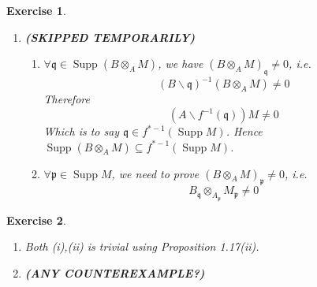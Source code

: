 \documentclass{article}
\theoremstyle{breakstyle}
\newtheorem{exercise}{Exercise}
\DeclareMathOperator{\ann}{Ann}
\DeclareMathOperator{\supp}{Supp}
\begin{document}
\begin{exercise}
\begin{enumerate}[label=({\roman*})]
\begin{align*}
                \supp{M / \mathfrak{a}M}
                &= \supp\left( (A / \mathfrak{a})\otimes _{A}M \right)  \\
                &= \supp(M)\cap \supp(A / \mathfrak{a}) \\
                &= V(\ann{M})\cap V(\ann{A / \mathfrak{a}}) \\
                &= V(\mathfrak{a}+\ann{M})
            \end{align*}
        \item 
            \textbf{(SKIPPED TEMPORARILY)}
            \begin{enumerate}[label=({\alph*})]
                \item 
                    $\forall \mathfrak{q}\in \supp{\left( B\otimes _{A}M \right) }$, we have $\left( B\otimes _{A}M \right) _{\mathfrak{q}}\neq 0$, i.e.
                    $$
                    \left( B\backslash \mathfrak{q} \right) ^{-1}\left( B\otimes _{A}M \right) \neq 0
                    $$
                    Therefore
                    $$
                    \left( A\backslash f^{-1}(\mathfrak{q}) \right) M\neq 0
                    $$
                    Which is to say $\mathfrak{q}\in f^{*-1}\left( \supp{M} \right) $.
                    Hence $\supp{\left( B\otimes _{A}M \right) }\subseteq f^{*-1}(\supp{M})$.
                \item 
                    $\forall \mathfrak{p}\in \supp{M}$, we need to prove $\left( B\otimes _{A}M \right) _{\mathfrak{p}}\neq 0$, i.e.
                    $$
                    B_{\mathfrak{q}}\otimes _{A_{\mathfrak{p}}}M_{\mathfrak{p}}\neq 0
                    $$
                    
            \end{enumerate}
    \end{enumerate}
\end{exercise}

\begin{exercise}
    \leavevmode \vspace{-\baselineskip}
    \begin{enumerate}[label=({\alph*})]
        \item 
            Both \emph{(i),(ii)} is trivial using \emph{Proposition 1.17(ii)}.
        \item 
            \textbf{(ANY COUNTEREXAMPLE?)}
    \end{enumerate}
\end{exercise}
\end{document}
